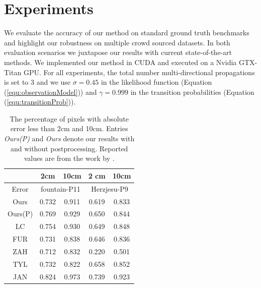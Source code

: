  

\section{Experiments} \label{sec2:experiment}
We evaluate the accuracy of our method on standard ground truth benchmarks and highlight our robustness on multiple crowd sourced datasets.
In both evaluation scenarios we juxtapose our results with current state-of-the-art methods.
We implemented our method in CUDA and executed on a Nvidia GTX-Titan GPU.
For all experiments, the total number multi-directional propagations is set to 3 and we use  $\sigma = 0.45$ in the likelihood function (Equation (\ref{equ:observationModel})) and $\gamma=0.999$ in the transition probabilities (Equation (\ref{equ:transitionProb})).  %

\begin{table}
\centering
    \begin{tabular}{|c|c|c|c|c|}
    \hline
         &  2cm &  10cm  & 2 cm & 10cm\\
    \hline
    Error & \multicolumn{2}{|c|}{fountain-P11} & \multicolumn{2}{|c|}{Herzjesu-P9}        \\
    \hline
    Ours & 0.732   & 0.911  & 0.619 & 0.833\\
    \hline
    Ours(P)& 0.769   & 0.929  & 0.650 & 0.844\\
    \hline
    LC \cite{LeastCommitment_3DIMPVT2012} & 0.754 &  {0.930} & 0.649 & 0.848 \\
    \hline
    FUR \cite{FURUKAWA_PAMI2010} & 0.731 & 0.838 & 0.646  & 0.836\\
    \hline
    ZAH \cite{Zaharescu_PAMI2011} & 0.712 & 0.832 & 0.220 & 0.501\\
    \hline
    TYL \cite{TYL} &0.732 & 0.822 & 0.658 & 0.852\\
    \hline
    JAN \cite{JAN} &0.824 & 0.973 & 0.739 & 0.923\\
    \hline
    \end{tabular}
\caption[Percentage of pixels with absolute error less than 2cm and 10cm.]{The percentage of pixels with absolute error less than 2cm and 10cm. Entries {\em Ours(P)}  and {\em Ours}  denote our results with and without postprocessing.  Reported values are from the work by \citet{LeastCommitment_3DIMPVT2012}.}
\label{tab:data}
\end{table}

